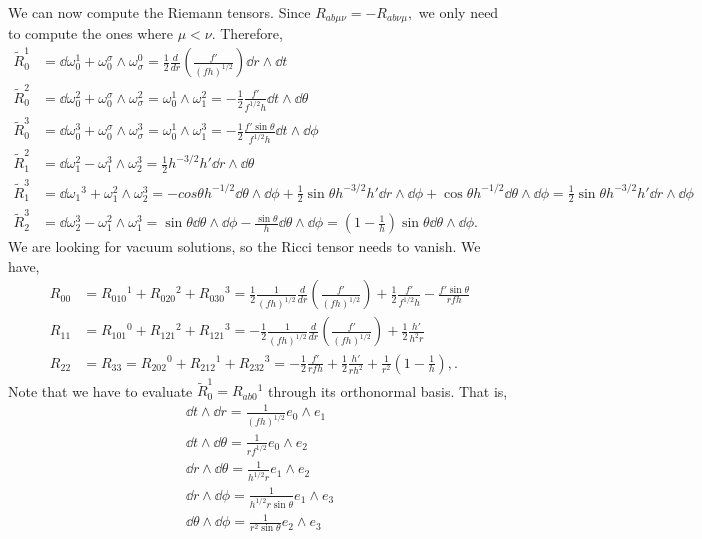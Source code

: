 \documentclass{article}
\numberwithin{equation}{section}
\begin{document}
We can now compute the Riemann tensors. Since $R_{ab\mu\nu} = -R_{ab\nu\mu},$ we only need to compute the ones where $\mu < \nu.$ Therefore,
\begin{align*}
    \tilde{R}_0^1 &= \dd{\omega_0^1} + \omega_0^{\sigma} \wedge \omega_\sigma^0 = \frac{1}{2}\frac{d}{dr}\left(\frac{f'}{(fh)^{1/2}}\right)\dd{r}\wedge \dd{t} \\ 
    \tilde{R}_0^2 &= \dd{\omega_0^2} + \omega_0^{\sigma} \wedge \omega_\sigma^2 = \omega_0^1 \wedge \omega_1^2 = -\frac{1}{2} \frac{f'}{f^{1/2}h}\dd{t}\wedge \dd{\theta} \\ 
    \tilde{R}_0^3 &= \dd{\omega_0^3} + \omega_0^{\sigma} \wedge \omega_\sigma^3 = \omega_0^1 \wedge \omega_1^3 = - \frac{1}{2} \frac{f'\sin\theta}{f^{1/2}h}\dd{t}\wedge \dd{\phi} \\ 
    \tilde{R}_1^2 &= \dd{\omega_1^2} - \omega_1^3 \wedge \omega_2^3 = \frac{1}{2}h^{-3/2}h'\dd{r}\wedge \dd{\theta} \\ 
    \tilde{R}_1^3 &= \dd{\omega_1}^3 + \omega_1^2 \wedge \omega_2^3 = -cos\theta h^{-1/2} \dd{\theta} \wedge \dd{\phi} + \frac{1}{2}\sin\theta h^{-3/2}h' \dd{r} \wedge \dd{\phi} + \cos\theta h^{-1/2} \dd{\theta} \wedge \dd{\phi} = \frac{1}{2}\sin\theta h^{-3/2}h' \dd{r}\wedge \dd{\phi} \\ 
    \tilde{R}_2^3 &= \dd{\omega_2^3} - \omega_1^2 \wedge \omega_1^3 = \sin\theta \dd{\theta}\wedge \dd{\phi} - \frac{\sin\theta}{h} \dd{\theta} \wedge \dd{\phi} = \left(1 - \frac{1}{h}\right)\sin\theta \dd{\theta}\wedge \dd{\phi}.
\end{align*}
We are looking for vacuum solutions, so the Ricci tensor needs to vanish. We have,
\begin{align*}
    R_{00} &= R_{010}{}^1 + R_{020}{}^2 + R_{030}{}^3 = \frac{1}{2} \frac{1}{(fh)^{1/2}}\frac{d}{dr}\left(\frac{f'}{(fh)^{1/2}}\right) + \frac{1}{2} \frac{f'}{f^{1/2}h} - \frac{f'\sin\theta}{rfh} \\ 
    R_{11} &= R_{101}{}^0 + R_{121}{}^2 + R_{121}{}^3 = -\frac{1}{2} \frac{1}{(fh)^{1/2}}\frac{d}{dr}\left(\frac{f'}{(fh)^{1/2}}\right) + \frac{1}{2} \frac{h'}{h^2 r} \\ 
    R_{22} &= R_{33} = R_{202}{}^0 + R_{212}{}^1 + R_{232}{}^3 = -\frac{1}{2}\frac{f'}{rfh} + \frac{1}{2} \frac{h'}{rh^2} + \frac{1}{r^2}\left(1 - \frac{1}{h}\right),.
\end{align*}
Note that we have to evaluate $\tilde{R}_0^1 = R_{ab0}{}^1$ through its orthonormal basis. That is, 
\begin{align*}
    \dd{t} \wedge \dd{r} = \frac{1}{(fh)^{1/2}} e_0 \wedge e_1 \\ 
    \dd{t} \wedge \dd{\theta} = \frac{1}{rf^{1/2}} e_0 \wedge e_2 \\ 
    \dd{r} \wedge \dd{\theta} = \frac{1}{h^{1/2} r}e_1 \wedge e_2 \\ 
    \dd{r} \wedge \dd{\phi} = \frac{1}{h^{1/2} r\sin\theta} e_1 \wedge e_3 \\ 
    \dd{\theta} \wedge \dd{\phi} = \frac{1}{r^2\sin\theta} e_2 \wedge e_3
\end{align*}
\end{document}

